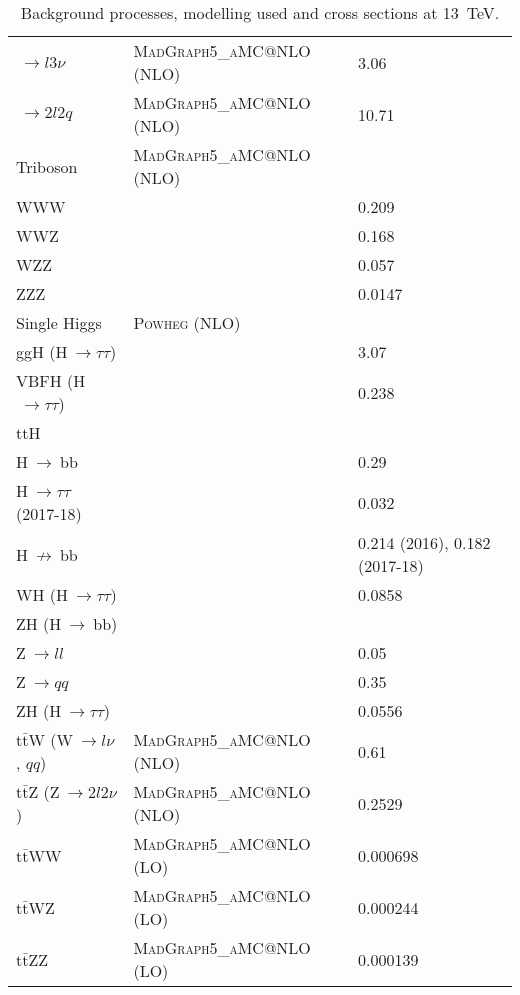 \documentclass[../main.tex]{subfiles}
\begin{document}
\begin{table}[p]
\begin{footnotesize}
\begin{center}
\begin{tabular}{l | l | l}
		\quad$~\to l3\nu$ & \textsc{MadGraph5\_aMC@NLO} (NLO) & 3.06 \\
		\quad$~\to 2l2q$ & \textsc{MadGraph5\_aMC@NLO} (NLO) & 10.71 \\
\hline
		Triboson & \textsc{MadGraph5\_aMC@NLO} (NLO) & \\
		WWW &  & 0.209 \\
		WWZ &  & 0.168 \\
		WZZ &  & 0.057 \\
		ZZZ &  & 0.0147 \\
\hline
		Single Higgs & \textsc{Powheg} (NLO) & \\
		ggH (H$~\to\tau\tau$) & & 3.07 \\
		VBFH  (H$~\to\tau\tau$) & & 0.238 \\
		ttH & & \\
		\quad H$~\to~$bb & & 0.29 \\
		\quad H$~\to\tau\tau$ (2017-18) & & 0.032 \\
		\quad H$~\not\to~$bb & & 0.214 (2016), 0.182 (2017-18) \\
		WH (H$~\to\tau\tau$) & & 0.0858 \\
		ZH (H$~\to~$bb) & & \\
		\quad Z$~\to ll$ & & 0.05 \\
		\quad Z$~\to qq$ & & 0.35 \\
		ZH (H$~\to\tau\tau$) & & 0.0556\\
\hline
		$\text{t}\bar{\text{t}}$W (W$~\to l\nu$, $qq$) & \textsc{MadGraph5\_aMC@NLO} (NLO) & 0.61 \\
		$\text{t}\bar{\text{t}}$Z (Z$~\to 2l2\nu$) & \textsc{MadGraph5\_aMC@NLO} (NLO) & 0.2529 \\
		$\text{t}\bar{\text{t}}$WW & \textsc{MadGraph5\_aMC@NLO} (LO) & 0.000698 \\
		$\text{t}\bar{\text{t}}$WZ & \textsc{MadGraph5\_aMC@NLO} (LO) & 0.000244 \\
		$\text{t}\bar{\text{t}}$ZZ & \textsc{MadGraph5\_aMC@NLO} (LO) & 0.000139 \\
	\end{tabular}
\end{center}
\end{footnotesize}
\caption[Background processes, modelling used and cross sections]{Background processes, modelling used and cross sections at 13~TeV.}
\label{hh:analysis:samples}
\end{table}
\end{document}

